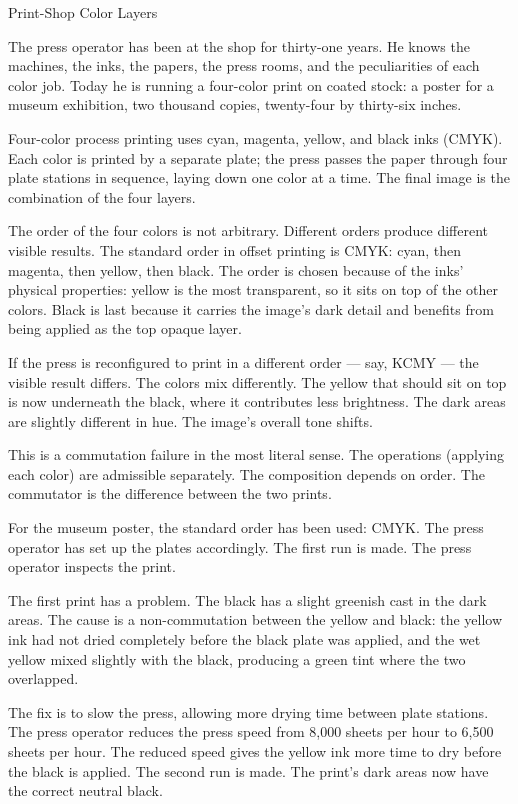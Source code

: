 \begin{coda}{Print-Shop Color Layers}

The press operator has been at the shop for thirty-one years. He knows
the machines, the inks, the papers, the press rooms, and the
peculiarities of each color job. Today he is running a four-color
print on coated stock: a poster for a museum exhibition, two thousand
copies, twenty-four by thirty-six inches.

Four-color process printing uses cyan, magenta, yellow, and black inks
(CMYK). Each color is printed by a separate plate; the press passes
the paper through four plate stations in sequence, laying down one
color at a time. The final image is the combination of the four
layers.

The order of the four colors is not arbitrary. Different orders
produce different visible results. The standard order in offset
printing is CMYK: cyan, then magenta, then yellow, then black. The
order is chosen because of the inks' physical properties: yellow is
the most transparent, so it sits on top of the other colors. Black is
last because it carries the image's dark detail and benefits from
being applied as the top opaque layer.

If the press is reconfigured to print in a different order --- say,
KCMY --- the visible result differs. The colors mix differently. The
yellow that should sit on top is now underneath the black, where it
contributes less brightness. The dark areas are slightly different in
hue. The image's overall tone shifts.

This is a commutation failure in the most literal sense. The
operations (applying each color) are admissible separately. The
composition depends on order. The commutator is the difference
between the two prints.

For the museum poster, the standard order has been used: CMYK. The
press operator has set up the plates accordingly. The first run is
made. The press operator inspects the print.

The first print has a problem. The black has a slight greenish cast
in the dark areas. The cause is a non-commutation between the yellow
and black: the yellow ink had not dried completely before the black
plate was applied, and the wet yellow mixed slightly with the black,
producing a green tint where the two overlapped.

The fix is to slow the press, allowing more drying time between plate
stations. The press operator reduces the press speed from 8,000
sheets per hour to 6,500 sheets per hour. The reduced speed gives
the yellow ink more time to dry before the black is applied. The
second run is made. The print's dark areas now have the correct
neutral black.


\end{coda}
